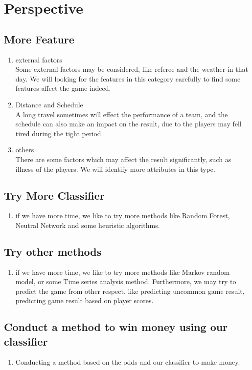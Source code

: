 \documentclass[conference,11pt]{article}
\begin{document}
\section{Perspective}
\subsection{More Feature}
\begin{enumerate}
\item{external factors}\\
Some external factors may be considered, like referee and the weather in that day. We will looking for the features in this category carefully to find some features affect the game indeed.
\item{Distance and Schedule}\\
A long travel sometimes will effect the performance of a team, and the schedule can also make an impact on the result, due to the players may fell tired during the tight period.
\item{others}\\
There are some factors which may affect the result significantly, such as illness of the players. We will identify more attributes in this type.
\end{enumerate}
\subsection{Try More Classifier}
\begin{enumerate}
\item if we have more time, we like to try more methods like Random Forest, Neutral Network and some heuristic algorithms.
\end{enumerate}

\subsection{Try other methods}
\begin{enumerate}
\item if we have more time, we like to try more methods like Markov random model, or some Time series analysis method. Furthermore, we may try to predict the game from other respect, like predicting uncommon game result, predicting game result based on player scores. 
\end{enumerate}

\subsection{Conduct a method to win money using our classifier}
\begin{enumerate}
\item Conducting a method based on the odds and our classifier to make money.
\end{enumerate}
\end{document}

